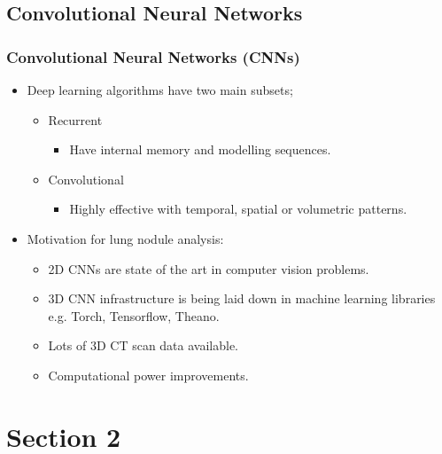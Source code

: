 \documentclass[11pt]{beamer}
\begin{document}
\subsection{Convolutional Neural Networks}
\begin{frame}
\frametitle{Convolutional Neural Networks (CNNs)}
\begin{itemize}
\item Deep learning algorithms have two main subsets; 
\begin{itemize}
\item Recurrent
\begin{itemize}
\item Have internal memory and modelling sequences.
\end{itemize}
\item Convolutional
\begin{itemize}
\item Highly effective with temporal, spatial or volumetric patterns.
\end{itemize}
\end{itemize}

\item Motivation for lung nodule analysis:
\begin{itemize}
\item 2D CNNs are state of the art in computer vision problems.
\item 3D CNN infrastructure is being laid down in machine learning libraries e.g. Torch, Tensorflow, Theano.
\item Lots of 3D CT scan data available.
\item Computational power improvements.
\end{itemize}
\end{itemize}
\end{frame}


\section{Section 2}
\end{document}
